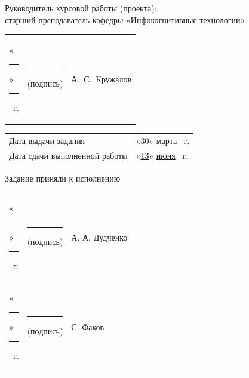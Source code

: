 \documentclass[14pt, a4paper]{extarticle}
\begin{document}

Руководитель курсовой работы (проекта): \\
старший преподаватель кафедры «Инфокогнитивные технологии»

{
\renewcommand{\arraystretch}{2}
\noindent
\begin{tabularx}{\textwidth}{@{} P{0.45\textwidth} P{0.3\textwidth} P{0.25\textwidth} @{}}
    «\rule{0.8cm}{0.4pt}» \quad \rule{2cm}{0.4pt} ~г. &
    \centering \rule{3.5cm}{0.4pt} \par \footnotesize (подпись) &
    \hfill А.~С.~Кружалов \\
\end{tabularx}

\begin{tabularx}{\textwidth}{@{} P{0.45\textwidth} P{0.55\textwidth} @{}}
    Дата выдачи задания           & 
    \hfill «\underline{30}» \quad \underline{марта} ~г. \\
    Дата сдачи выполненной работы & 
    \hfill «\underline{13}» \quad \underline{июня} ~г. \\
\end{tabularx}
}

Задание приняли к исполнению

{
\renewcommand{\arraystretch}{1.5}
\begin{tabularx}{\textwidth}{@{} P{0.45\textwidth} P{0.3\textwidth} P{0.25\textwidth} @{}}
    «\rule{0.8cm}{0.4pt}» \quad \rule{2cm}{0.4pt} ~г. &
    \centering \rule{3.5cm}{0.4pt} \par \footnotesize (подпись) &
    \hfill А. А. Дудченко \\
    «\rule{0.8cm}{0.4pt}» \quad \rule{2cm}{0.4pt} ~г. &
    \centering \rule{3.5cm}{0.4pt} \par \footnotesize (подпись) &
    \hfill С. Факов \\
\end{tabularx}
}
\end{document}
